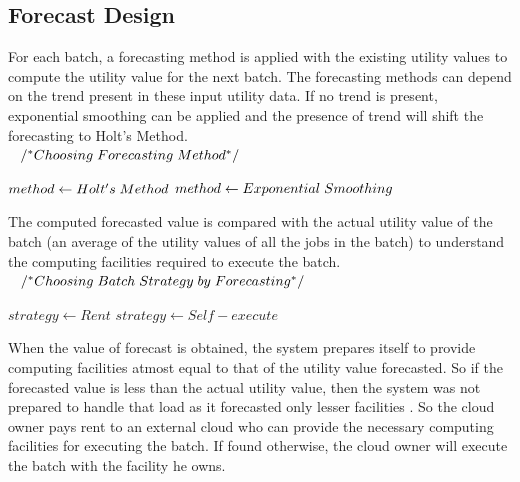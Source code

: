 \subsection{Forecast Design}
For each batch, a forecasting method is applied with the existing utility values to compute the utility value for the next batch. The forecasting methods can depend on the trend present in these input utility data. If no trend is present, exponential smoothing can be applied and the presence of trend will shift the forecasting to Holt's Method.\\[0.2cm]
$\hspace*{3mm}/^\ast Choosing\hspace*{1mm}Forecasting\hspace*{1mm}Method^\ast/$\\
\begin{algorithmic}
	\STATE $method \gets Holt's\hspace*{1mm}Method$
\ELSE
	\STATE $method \gets Exponential\hspace*{1mm}Smoothing$ 
\ENDIF
\end{algorithmic}
\vspace{0.2cm}
The computed forecasted value is compared with the actual utility value of the batch (an average of the utility values of all the jobs in the batch) to understand the computing facilities required to execute the batch.\\[0.3cm]
$\hspace*{3mm}/^\ast Choosing\hspace*{1mm}Batch\hspace*{1mm}Strategy\hspace*{1mm}by\hspace*{1mm}Forecasting^\ast/$\\ 
\begin{algorithmic}
	\STATE $strategy \gets Rent$
\ELSE
	\STATE $strategy \gets Self-execute$
\ENDIF
\end{algorithmic}
\vspace{0.2cm}
When the value of forecast is obtained, the system prepares itself to provide computing facilities atmost equal to that of the utility value forecasted. So if the forecasted value is less than the actual utility value, then the system was not prepared to handle that load as it forecasted only lesser facilities . So the cloud owner pays rent to an external cloud who can provide the necessary computing facilities for executing the batch. If found otherwise, the cloud owner will execute the batch with the facility he owns.\\[0.2cm]
